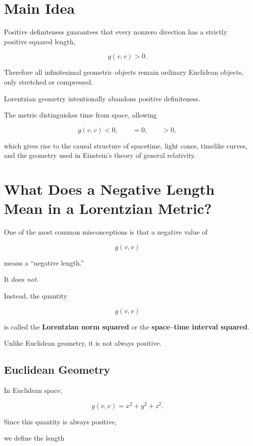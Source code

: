 \documentclass[12pt,a4paper]{article}
\theoremstyle{notespace}
\begin{document}

\section{Main Idea}

Positive definiteness guarantees that every nonzero direction has a
strictly positive squared length,

\[
g(v,v)>0.
\]

Therefore all infinitesimal geometric objects remain ordinary Euclidean
objects, only stretched or compressed.

Lorentzian geometry intentionally abandons positive definiteness.

The metric distinguishes time from space, allowing

\[
g(v,v)
<
0,\qquad
=
0,\qquad
>
0,
\]

which gives rise to the causal structure of spacetime, light cones,
timelike curves, and the geometry used in Einstein's theory of general
relativity.

\section{What Does a Negative Length Mean in a Lorentzian Metric?}

One of the most common misconceptions is that a negative value of

\[
g(v,v)
\]

means a ``negative length.''

It does \emph{not}.

Instead, the quantity

\[
g(v,v)
\]

is called the \textbf{Lorentzian norm squared} or the
\textbf{space--time interval squared}.

Unlike Euclidean geometry, it is not always positive.


\subsection{Euclidean Geometry}

In Euclidean space,

\[
g(v,v)
=
x^2+y^2+z^2.
\]

Since this quantity is always positive,

we define the length
\end{document}
